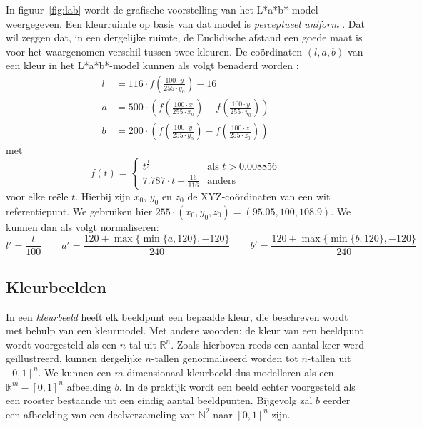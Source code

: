 In figuur~\ref{fig:lab} wordt de grafische voorstelling van het L*a*b*-model weergegeven. 
Een kleurruimte op basis van dat model is \emph{perceptueel uniform} 
\cite{sharma:digital_color_imaging}. Dat wil zeggen dat, in een dergelijke 
ruimte, de Euclidische afstand een goede maat is voor het waargenomen verschil 
tussen twee kleuren. De co\"ordinaten $(l,a,b)$ van een kleur in het 
L*a*b*-model kunnen als volgt benaderd worden
\cite{debaets:similariteitsmaten_voor_kleurbeelden, philips:beeldverwerking}:
\begin{align*}
l & = 116 \cdot f({\scriptstyle\frac{100 \cdot y}{255 \cdot y_0}}) - 16 \\[2pt] 
a & = 500 \cdot \left(f({\scriptstyle\frac{\scriptstyle 100 \cdot x}{\scriptstyle 255 \cdot x_0}}) - f({\scriptstyle\frac{\scriptstyle 100 \cdot y}{\scriptstyle 255 \cdot y_0}})\right) \\[2pt] 
b & = 200 \cdot \left(f({\scriptstyle\frac{\scriptstyle 100 \cdot y}{\scriptstyle 255 \cdot y_0}}) - f({\scriptstyle\frac{\scriptstyle 100 \cdot z}{\scriptstyle 255 \cdot z_0}})\right)
\end{align*}
met
\begin{displaymath}
f(t) = \begin{cases} 
t^\frac{1}{3} & \textrm{als } t > 0.008856 \\ 
7.787 \cdot t + \frac{16}{116} & \textrm{anders}
\end{cases}
\end{displaymath}
voor elke re\"ele $t$. Hierbij zijn $x_0$, $y_0$ en $z_0$ de
XYZ-co\"ordinaten van een wit referentiepunt. We gebruiken hier 
$255 \cdot (x_0,y_0,z_0)=(95.05,100,108.9)$.
We kunnen dan als volgt normaliseren:
\begin{displaymath}
l' = \frac{l}{100} \qquad a' = \frac{120 + 
\max\{\min\{a,120\},-120\}}{240} \qquad b' = \frac{120 + \max\{\min\{b,120\},-120\}}{240}
\end{displaymath}


\subsection{Kleurbeelden}

In een \emph{kleurbeeld} heeft elk beeldpunt een bepaalde kleur, die beschreven wordt met
behulp van een kleurmodel. Met andere woorden: de kleur van een beeldpunt wordt voorgesteld 
als een $n$-tal uit
$\mathbb{R}^n$. Zoals hierboven reeds een aantal keer werd ge\"illustreerd, kunnen dergelijke 
$n$-tallen genormaliseerd worden tot $n$-tallen uit $[0,1]^n$. We kunnen een $m$-dimensionaal 
kleurbeeld dus modelleren als een $\mathbb{R}^m - [0,1]^n$ afbeelding $b$. 
In de praktijk wordt een beeld echter voorgesteld als een rooster bestaande uit een
eindig aantal beeldpunten. Bijgevolg zal $b$ eerder een afbeelding van een deelverzameling van 
$\mathbb{N}^2$ naar $[0,1]^n$ zijn. 

